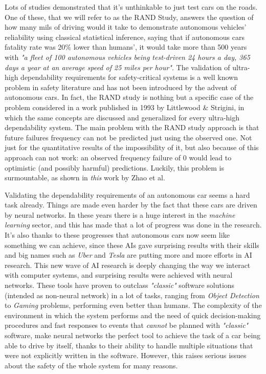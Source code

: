 Lots of studies demonstrated that it's unthinkable to just test cars on the roads. One of these, that we will refer to as the RAND Study, answers the question of how many mils of driving would it take to demonstrate autonomous vehicles' reliability using classical statistical inference, saying that if autonomous cars fatality rate was 20\% lower than humans', it would take more than 500 years with \textsl{"a fleet of 100 autonomous vehicles being test-driven 24 hours a day, 365 days a year at an average speed of 25 miles per hour"}.\cite{randstudy}\newline
The validation of ultra-high dependability requirements for safety-critical systems is a well known problem in safety literature and has not been introduced by the advent of autonomous cars. In fact, the RAND study is nothing but a specific case of the problem considered in a work published in 1993 by Littlewood \& Strigini, in which the same concepts are discussed and generalized for every ultra-high dependability system.\cite{littlewoodStrigini}\newline
The main problem with the RAND study approach is that future failures frequency can not be predicted just using the observed one. Not just for the quantitative results of the impossibility of it, but also because of this approach can not work: an observed frequency failure of 0 would lead to optimistic (and possibly harmful) predictions. Luckily, this problem is surmountable, as shown in \textsl{this}\cite{zhaoStrigini} work by Zhao et al.\newline

Validating the dependability requirements of an autonomous car seems a hard task already. Things are made even harder by the fact that these cars are driven by neural networks.\newline
In these years there is a huge interest in the \textsl{machine learning} sector, and this has made that a lot of progress was done in the research. It's also thanks to these progresses that autonomous cars now seem like something we can achieve, since these AIs gave surprising results with their skills and big names such as \textsl{Uber} and \textsl{Tesla} are putting more and more efforts in AI research.
This new wave of AI research is deeply changing the way we interact with computer systems, and surprising results were achieved with neural networks.\newline
These tools have proven to outclass \textsl{"classic"} software solutions (intended as non-neural network) in a lot of tasks, ranging from \textsl{Object Detection}\cite{retinaNet} to \textsl{Gaming}\cite{alphaGo} problems, performing even better than humans.\cite{alphaGoBeatsMan}
The complexity of the environment in which the system performs and the need of quick decision-making procedures and fast responses to events that \textsl{cannot} be planned with \textsl{"classic"} software, make neural networks the perfect tool to achieve the task of a car being able to drive by itself, thanks to their ability to handle multiple situations that were not explicitly written in the software. However, this raises serious issues about the safety of the whole system for many reasons.\newline

